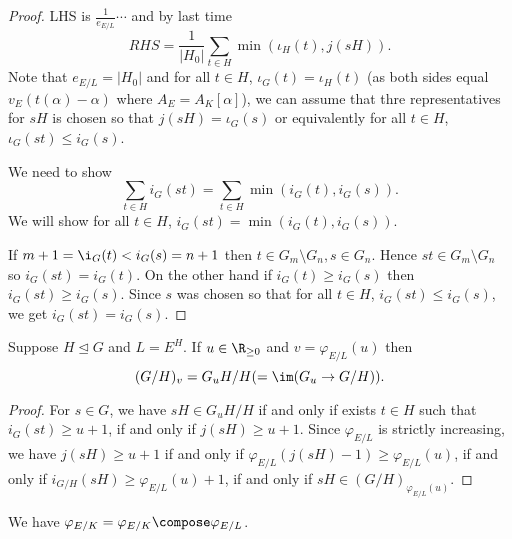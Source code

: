 \documentclass[a4paper]{article}
\begin{document}
\begin{proof}
  LHS is \(\frac{1}{e_{E/L}} \cdots\) and by last time
  \[
    RHS = \frac{1}{|H_0|} \sum_{t \in H} \min(\iota_H(t), j(sH)).
  \]
  Note that \(e_{E/L} = |H_0|\) and for all \(t \in H\), \(\iota_G(t) = \iota_H(t)\) (as both sides equal \(v_E(t(\alpha) - \alpha)\) where \(A_E = A_K[\alpha]\)), we can assume that thre representatives for \(sH\) is chosen so that \(j(sH) = \iota_G(s)\) or equivalently for all \(t \in H\), \(\iota_G(st) \leq i_G(s)\).

  We need to show
  \[
    \sum_{t \in H} i_G(st) = \sum_{t \in H} \min(i_G(t), i_G(s)).
  \]
  We will show for all \(t \in H\), \(i_G(st) = \min(i_G(t), i_G(s))\).

  If \(m + 1 = \i_G(t) < i_G(s) = n + 1\) then \(t \in G_m \setminus G_n, s \in G_n\). Hence \(st \in G_m \setminus G_n\) so \(i_G(st) = i_G(t)\). On the other hand if \(i_G(t) \geq i_G(s)\) then \(i_G(st) \geq i_G(s)\). Since \(s\) was chosen so that for all \(t \in H\), \(i_G(st) \leq i_G(s)\), we get \(i_G(st) = i_G(s)\).
\end{proof}

\begin{theorem}[Herbrand]
  Suppose \(H \trianglelefteq G\) and \(L = E^H\). If \(u \in \R_{\geq 0}\) and \(v = \varphi_{E/L}(u)\) then
  \[
    (G/H)_v = G_uH/H (= \im(G_u \to G/H)).
  \]
\end{theorem}

\begin{proof}
  For \(s \in G\), we have \(sH \in G_uH/H\) if and only if exists \(t \in H\) such that \(i_G(st) \geq u + 1\), if and only if \(j(sH) \geq u + 1\). Since \(\varphi_{E/L}\) is strictly increasing, we have \(j(sH) \geq u + 1\) if and only if \(\varphi_{E/L}(j(sH) - 1) \geq \varphi_{E/L}(u)\), if and only if \(i_{G/H}(sH) \geq \varphi_{E/L}(u) + 1\), if and only if \(sH \in (G/H)_{\varphi_{E/L}(u)}\).
\end{proof}

\begin{lemma}
  We have \(\varphi_{E/K} = \varphi_{E/K} \compose \varphi_{E/L}\).
\end{lemma}
\end{document}
